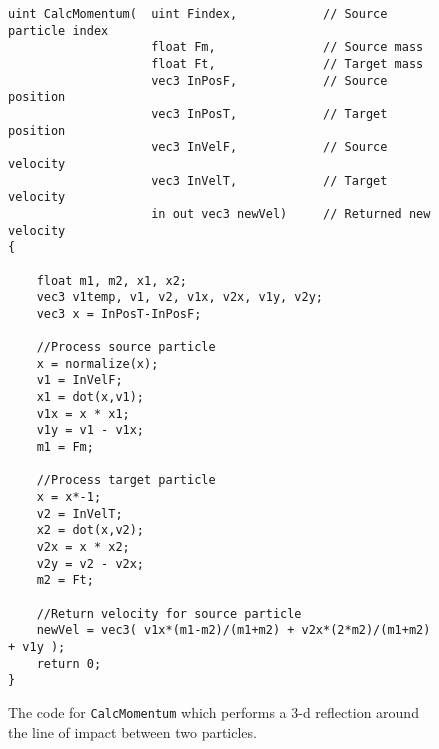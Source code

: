 
\begin{figure}[h]
\centering
\lstset{style=gpucode,linewidth=6.in,xleftmargin=0.25in}

\begin{lstlisting}
uint CalcMomentum(	uint Findex, 			// Source particle index
					float Fm, 			    // Source mass		
					float Ft,				// Target mass
					vec3 InPosF,			// Source position
					vec3 InPosT,			// Target position
					vec3 InVelF,			// Source velocity
					vec3 InVelT,			// Target velocity
					in out vec3 newVel)		// Returned new velocity
{

	float m1, m2, x1, x2;
	vec3 v1temp, v1, v2, v1x, v2x, v1y, v2y; 
	vec3 x = InPosT-InPosF;

	//Process source particle 
	x = normalize(x);
	v1 = InVelF;
	x1 = dot(x,v1);
	v1x = x * x1;
	v1y = v1 - v1x;
	m1 = Fm;
	
	//Process target particle 
	x = x*-1;
	v2 = InVelT;
	x2 = dot(x,v2);
	v2x = x * x2;
	v2y = v2 - v2x;
	m2 = Ft;

	//Return velocity for source particle
	newVel = vec3( v1x*(m1-m2)/(m1+m2) + v2x*(2*m2)/(m1+m2) + v1y );
    return 0;
}
\end{lstlisting}


\caption[Calculate collision momentum]{The code for \texttt{CalcMomentum} which performs a 3-d reflection around the line of impact between two particles. }
\label{fig:CalcMomentum}
\end{figure}
